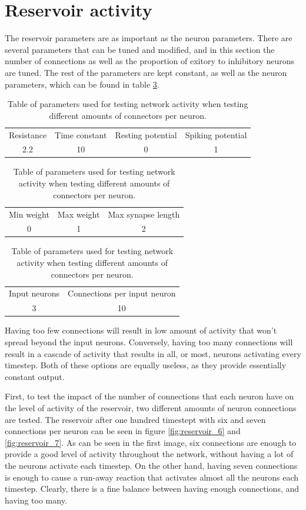 \section{Reservoir activity}

The reservoir parameters are as important as the neuron parameters. There are several parameters that can be tuned and modified, and in this section the number of connections as well as the proportion of exitory to inhibitory neurons are tuned. The rest of the parameters are kept constant, as well as the neuron parameters, which can be found in table \ref{tab:reservoir}.

\begin{table}[h]
\centering
\begin{tabular}{cccc}
Resistance & Time constant & Resting potential & Spiking potential\\
2.2 & 10 & 0 & 1
\end{tabular}
\begin{tabular}{ccc}
Min weight & Max weight & Max synapse length\\
0 & 1 & 2
\end{tabular}
\begin{tabular}{cc}
Input neurons & Connections per input neuron\\
3 & 10
\end{tabular}
\caption{Table of parameters used for testing network activity when testing different amounts of connectors per neuron.}
\label{tab:reservoir}
\end{table}

 Having too few connections will result in low amount of activity that won't spread beyond the input neurons. Conversely, having too many connections will result in a cascade of activity that results in all, or most, neurons activating every timestep. Both of these options are equally useless, as they provide essentially constant output.

First, to test the impact of the number of connections that each neuron have on the level of activity of the reservoir, two different amounts of neuron connections are tested. The reservoir after one hundred timestept with six and seven connections per neuron can be seen in figure \ref{fig:reservoir_6} and \ref{fig:reservoir_7}. As can be seen in the first image, six connections are enough to provide a good level of activity throughout the network, without having a lot of the neurons activate each timestep. On the other hand, having seven connections is enough to cause a run-away reaction that activates almost all the neurons each timestep. Clearly, there is a fine balance between having enough connections, and having too many.

